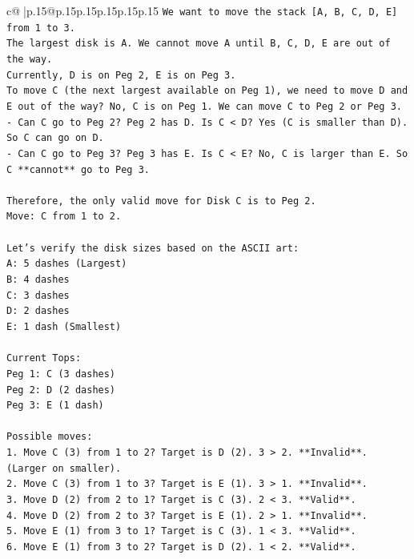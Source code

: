 \documentclass{article}
\begin{document}
{\begin{supertabular}{c@{$\;$}|p{.15\linewidth}@{}p{.15\linewidth}p{.15\linewidth}p{.15\linewidth}p{.15\linewidth}p{.15\linewidth}}
{{{\texttt{We want to move the stack {[}A, B, C, D, E{]} from 1 to 3.} \\
\texttt{The largest disk is A. We cannot move A until B, C, D, E are out of the way.} \\
\texttt{Currently, D is on Peg 2, E is on Peg 3.} \\
\texttt{To move C (the next largest available on Peg 1), we need to move D and E out of the way? No, C is on Peg 1. We can move C to Peg 2 or Peg 3.} \\
\texttt{{-} Can C go to Peg 2? Peg 2 has D. Is C < D? Yes (C is smaller than D). So C can go on D.} \\
\texttt{{-} Can C go to Peg 3? Peg 3 has E. Is C < E? No, C is larger than E. So C **cannot** go to Peg 3.} \\
\\ 
\texttt{Therefore, the only valid move for Disk C is to Peg 2.} \\
\texttt{Move: C from 1 to 2.} \\
\\ 
\texttt{Let's verify the disk sizes based on the ASCII art:} \\
\texttt{A: 5 dashes (Largest)} \\
\texttt{B: 4 dashes} \\
\texttt{C: 3 dashes} \\
\texttt{D: 2 dashes} \\
\texttt{E: 1 dash (Smallest)} \\
\\ 
\texttt{Current Tops:} \\
\texttt{Peg 1: C (3 dashes)} \\
\texttt{Peg 2: D (2 dashes)} \\
\texttt{Peg 3: E (1 dash)} \\
\\ 
\texttt{Possible moves:} \\
\texttt{1. Move C (3) from 1 to 2? Target is D (2). 3 > 2. **Invalid**. (Larger on smaller).} \\
\texttt{2. Move C (3) from 1 to 3? Target is E (1). 3 > 1. **Invalid**.} \\
\texttt{3. Move D (2) from 2 to 1? Target is C (3). 2 < 3. **Valid**.} \\
\texttt{4. Move D (2) from 2 to 3? Target is E (1). 2 > 1. **Invalid**.} \\
\texttt{5. Move E (1) from 3 to 1? Target is C (3). 1 < 3. **Valid**.} \\
\texttt{6. Move E (1) from 3 to 2? Target is D (2). 1 < 2. **Valid**.} \\
}}}
\end{supertabular}}
\end{document}
